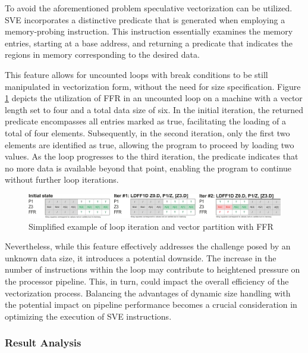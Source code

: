 To avoid the aforementioned problem speculative vectorization can be utilized. SVE incorporates a distinctive predicate that is generated when employing a memory-probing instruction. This instruction essentially examines the memory entries, starting at a base address, and returning a predicate that indicates the regions in memory corresponding to the desired data.

This feature allows for uncounted loops with break conditions to be still manipulated in vectorization form, without the need for size specification. Figure \ref{fig:ffr-example} depicts the utilization of FFR in an uncounted loop on a machine with a vector length set to four and a total data size of six. In the initial iteration, the returned predicate encompasses all entries marked as true, facilitating the loading of a total of four elements. Subsequently, in the second iteration, only the first two elements are identified as true, allowing the program to proceed by loading two values. As the loop progresses to the third iteration, the predicate indicates that no more data is available beyond that point, enabling the program to continue without further loop iterations.

\begin{figure}[H]
	\begin{center}
 		\includegraphics[width=\linewidth]{images/ffr-example copy.pdf}
 		\caption{Simplified example of loop iteration and vector partition with FFR}
 		\label{fig:ffr-example}
	\end{center} 
\end{figure}

Nevertheless, while this feature effectively addresses the challenge posed by an unknown data size, it introduces a potential downside. The increase in the number of instructions within the loop may contribute to heightened pressure on the processor pipeline. This, in turn, could impact the overall efficiency of the vectorization process. Balancing the advantages of dynamic size handling with the potential impact on pipeline performance becomes a crucial consideration in optimizing the execution of SVE instructions.

\subsubsection{Result Analysis}

